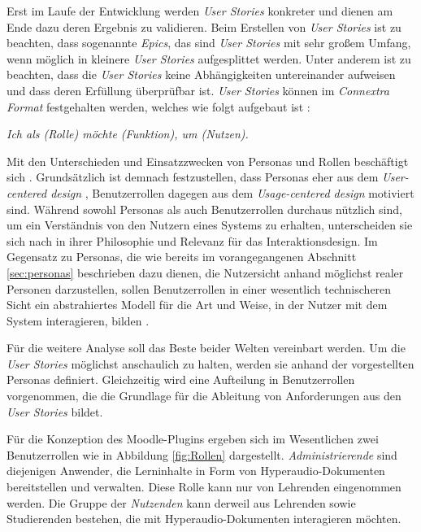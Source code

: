 Erst im Laufe der Entwicklung werden \textit{User Stories} konkreter und dienen am Ende dazu deren Ergebnis zu validieren. Beim Erstellen von \textit{User Stories} ist zu beachten, dass sogenannte \textit{Epics}, das sind \textit{User Stories} mit sehr großem Umfang, wenn möglich in kleinere \textit{User Stories} aufgesplittet werden. Unter anderem ist zu beachten, dass die \textit{User Stories} keine Abhängigkeiten untereinander aufweisen und dass deren Erfüllung überprüfbar ist. \textit{User Stories} können im \textit{Connextra Format} festgehalten werden, welches wie folgt aufgebaut ist \citep{cohn2004user}:

\par
\begingroup
\leftskip=1cm
\rightskip=1.5cm
\noindent

\textit{Ich als (Rolle) möchte (Funktion), um (Nutzen).}

\par
\endgroup

\vspace{.3cm}

Mit den Unterschieden und Einsatzzwecken von Personas und Rollen beschäftigt sich \cite{constantine2006users}. Grundsätzlich ist demnach festzustellen, dass Personas eher aus dem \textit{User-centered design} \citep{Norman1986user}, Benutzerrollen dagegen aus dem \textit{Usage-centered design} \citep{Constantine1996usage} motiviert sind. Während sowohl Personas als auch Benutzerrollen durchaus nützlich sind, um ein Verständnis von den Nutzern eines Systems zu erhalten, unterscheiden sie sich nach \cite{constantine2006users} in ihrer Philosophie und Relevanz für das Interaktionsdesign. Im Gegensatz zu Personas, die wie bereits im vorangegangenen Abschnitt \ref{sec:personas} beschrieben dazu dienen, die Nutzersicht anhand möglichst realer Personen darzustellen, sollen Benutzerrollen in einer wesentlich technischeren Sicht ein abstrahiertes Modell für die Art und Weise, in der Nutzer mit dem System interagieren, bilden \citep{constantine2006users}.

Für die weitere Analyse soll das Beste beider Welten vereinbart werden. Um die \textit{User Stories} möglichst anschaulich zu halten, werden sie anhand der vorgestellten Personas definiert. Gleichzeitig wird eine Aufteilung in Benutzerrollen vorgenommen, die die Grundlage für die Ableitung von Anforderungen aus den \textit{User Stories} bildet.

Für die Konzeption des Moodle-Plugins ergeben sich im Wesentlichen zwei Benutzerrollen wie in Abbildung \ref{fig:Rollen} dargestellt. \textit{Administrierende} sind diejenigen Anwender, die Lerninhalte in Form von Hyperaudio-Dokumenten bereitstellen und verwalten. Diese Rolle kann nur von Lehrenden eingenommen werden. Die Gruppe der \textit{Nutzenden} kann derweil aus Lehrenden sowie Studierenden bestehen, die mit Hyperaudio-Dokumenten interagieren möchten.

